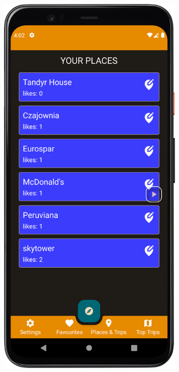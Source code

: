         \begin{figure}[H]
            \centering
            \begin{subfigure}[b]{0.28\textwidth}
                \centering
                \includegraphics[width=\textwidth]{src/app/user_places.png}

\end{subfigure}
\end{figure}
